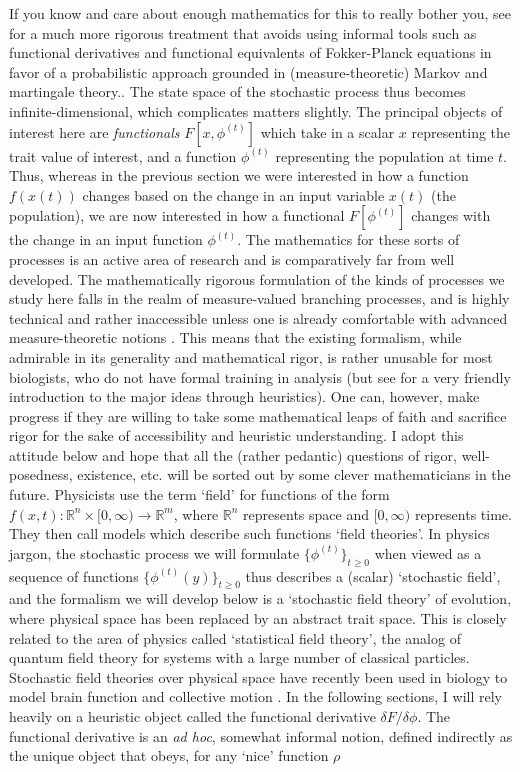{If you know and care about enough mathematics for this to really bother you, see \citep{champagnat_unifying_2006} for a much more rigorous treatment that avoids using informal tools such as functional derivatives and functional equivalents of Fokker-Planck equations in favor of a probabilistic approach grounded in (measure-theoretic) Markov and martingale theory.}. The state space of the stochastic process thus becomes infinite-dimensional, which complicates matters slightly. The principal objects of interest here are \emph{functionals} $F[x, \phi^{(t)}]$ which take in a scalar $x$ representing the trait value of interest, and a function $\phi^{(t)}$ representing the population at time $t$. Thus, whereas in the previous section we were interested in how a function $f(x(t))$ changes based on the change in an input variable $x(t)$ (the population), we are now interested in how a functional $F[\phi^{(t)}]$ changes with the change in an input function $\phi^{(t)}$. The mathematics for these sorts of processes is an active area of research and is comparatively far from well developed. The mathematically rigorous formulation of the kinds of processes we study here falls in the realm of measure-valued branching processes, and is highly technical and rather inaccessible unless one is already comfortable with advanced measure-theoretic notions \citep{champagnat_unifying_2006,champagnat_individual_2008}. This means that the existing formalism, while admirable in its generality and mathematical rigor, is rather unusable for most biologists, who do not have formal training in analysis (but see \cite{week_white_2021} for a very friendly introduction to the major ideas through heuristics). One can, however, make progress if they are willing to take some mathematical leaps of faith and sacrifice rigor for the sake of accessibility and heuristic understanding. I adopt this attitude below and hope that all the (rather pedantic) questions of rigor, well-posedness, existence, etc. will be sorted out by some clever mathematicians in the future. Physicists use the term `field' for functions of the form $f(x,t):\mathbb{R}^{n} \times [0,\infty) \to \mathbb{R}^{m}$, where $\mathbb{R}^{n}$ represents space and $[0,\infty)$ represents time. They then call models which describe such functions `field theories'. In physics jargon, the stochastic process we will formulate $\{\phi^{(t)}\}_{t \geq 0}$ when viewed as a sequence of functions $\{\phi^{(t)}(y)\}_{t \geq 0}$ thus describes a (scalar) `stochastic field', and the formalism we will develop below is a `stochastic field theory' of evolution, where physical space has been replaced by an abstract trait space. This is closely related to the area of physics called `statistical field theory', the analog of quantum field theory for systems with a large number of classical particles. Stochastic field theories over physical space have recently been used in biology to model brain function \citep{bressloff_stochastic_2010} and collective motion \citep{o_laighleis_minimal_2018}. In the following sections, I will rely heavily on a heuristic object called the functional derivative $\delta F/\delta \phi$. The functional derivative is an \emph{ad hoc}, somewhat informal notion, defined indirectly as the unique object that obeys, for any `nice' function $\rho$
